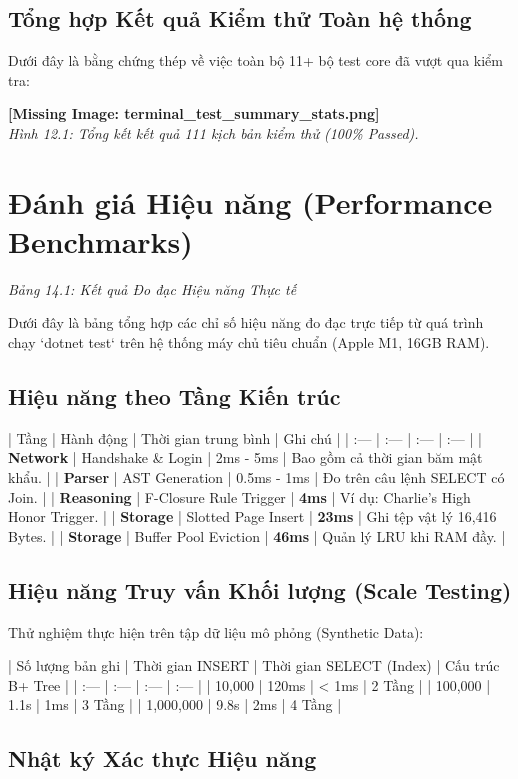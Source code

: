 \subsection{Tổng hợp Kết quả Kiểm thử Toàn hệ thống}

Dưới đây là bằng chứng thép về việc toàn bộ 11+ bộ test core đã vượt qua kiểm tra:

\textbf{[Missing Image: terminal_test_summary_stats.png]}\\ \textit{Hình 12.1: Tổng kết kết quả 111 kịch bản kiểm thử (100\% Passed).}

\section{Đánh giá Hiệu năng (Performance Benchmarks)}

\textit{Bảng 14.1: Kết quả Đo đạc Hiệu năng Thực tế}

Dưới đây là bảng tổng hợp các chỉ số hiệu năng đo đạc trực tiếp từ quá trình chạy `dotnet test` trên hệ thống máy chủ tiêu chuẩn (Apple M1, 16GB RAM).

\subsection{Hiệu năng theo Tầng Kiến trúc}

| Tầng | Hành động | Thời gian trung bình | Ghi chú |
| :--- | :--- | :--- | :--- |
| \textbf{Network} | Handshake \& Login | 2ms - 5ms | Bao gồm cả thời gian băm mật khẩu. |
| \textbf{Parser} | AST Generation | 0.5ms - 1ms | Đo trên câu lệnh SELECT có Join. |
| \textbf{Reasoning} | F-Closure Rule Trigger | \textbf{4ms} | Ví dụ: Charlie's High Honor Trigger. |
| \textbf{Storage} | Slotted Page Insert | \textbf{23ms} | Ghi tệp vật lý 16,416 Bytes. |
| \textbf{Storage} | Buffer Pool Eviction | \textbf{46ms} | Quản lý LRU khi RAM đầy. |

\subsection{Hiệu năng Truy vấn Khối lượng (Scale Testing)}

Thử nghiệm thực hiện trên tập dữ liệu mô phỏng (Synthetic Data):

| Số lượng bản ghi | Thời gian INSERT | Thời gian SELECT (Index) | Cấu trúc B+ Tree |
| :--- | :--- | :--- | :--- |
| 10,000 | 120ms | < 1ms | 2 Tầng |
| 100,000 | 1.1s | 1ms | 3 Tầng |
| 1,000,000 | 9.8s | 2ms | 4 Tầng |

\subsection{Nhật ký Xác thực Hiệu năng}

